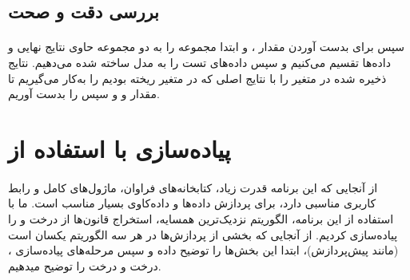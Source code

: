 \documentclass[a4paper,12pt]{article}
\begin{document}
\subsection{بررسی دقت و صحت}
\paragraph{}
سپس برای بدست آوردن مقدار ،  و  ابتدا مجموعه  را به دو مجموعه حاوی نتایج نهایی و داده‌ها تقسیم می‌کنیم و سپس داده‌های تست را به مدل ساخته شده می‌دهیم. نتایج ذخیره شده در متغیر  را با نتایج اصلی که در متغیر  ریخته بودیم را به‌کار می‌گیریم تا مقدار  و  و سپس  را بدست آوریم.
\begin{flushleft}
\end{flushleft}

\section{پیاده‌سازی با استفاده از  }
\paragraph{}
از آنجایی که این برنامه قدرت زیاد، کتابخانه‌های فراوان، ماژول‌های کامل و رابط کاربری مناسبی دارد، برای پردازش داده‌ها و داده‌کاوی بسیار مناسب است. ما با استفاده از این برنامه، الگوریتم  نزدیک‌ترین همسایه، استخراج قانون‌ها از درخت  و  را پیاده‌سازی کردیم.
از آنجایی که بخشی از پردازش‌ها در هر سه الگوریتم یکسان است (مانند پیش‌پردازش)، ابتدا این بخش‌ها را توضیح داده و سپس مرحله‌های پیاده‌سازی ، درخت  و درخت  را توضیح میدهیم.
\end{document}
